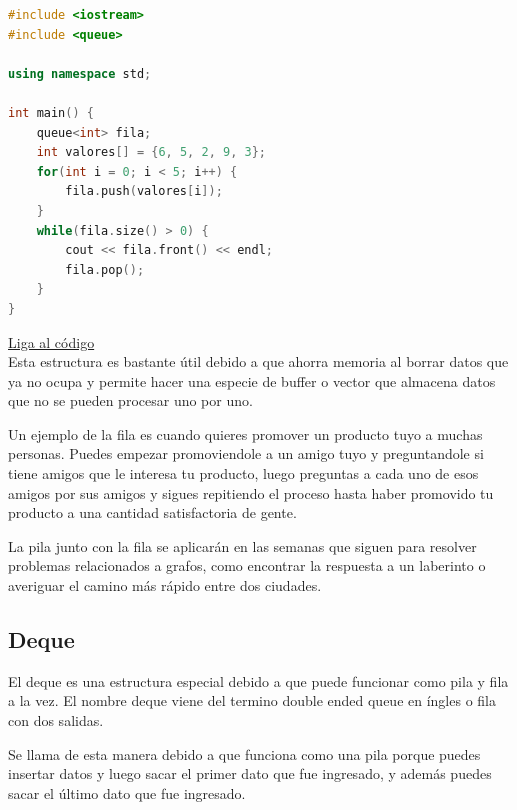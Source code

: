 \documentclass{article}
\begin{document}
\begin{lstlisting}[language=C++, title=Filas]
#include <iostream>
#include <queue>

using namespace std;

int main() {
	queue<int> fila;
	int valores[] = {6, 5, 2, 9, 3};
	for(int i = 0; i < 5; i++) {
		fila.push(valores[i]);
	}
	while(fila.size() > 0) {
		cout << fila.front() << endl;
		fila.pop();
	}
}
\end{lstlisting}
\href{https://repl.it/@Jamesscn/Haciendo-filas}{Liga al código} \\

Esta estructura es bastante útil debido a que ahorra memoria al borrar datos que ya no ocupa y permite hacer una especie de buffer o vector que almacena datos que no se pueden procesar uno por uno.

Un ejemplo de la fila es cuando quieres promover un producto tuyo a muchas personas. Puedes empezar promoviendole a un amigo tuyo y preguntandole si tiene amigos que le interesa tu producto, luego preguntas a cada uno de esos amigos por sus amigos y sigues repitiendo el proceso hasta haber promovido tu producto a una cantidad satisfactoria de gente.

La pila junto con la fila se aplicarán en las semanas que siguen para resolver problemas relacionados a grafos, como encontrar la respuesta a un laberinto o averiguar el camino más rápido entre dos ciudades.

\subsection{Deque}

El deque es una estructura especial debido a que puede funcionar como pila y fila a la vez. El nombre deque viene del termino double ended queue en íngles o fila con dos salidas.

Se llama de esta manera debido a que funciona como una pila porque puedes insertar datos y luego sacar el primer dato que fue ingresado, y además puedes sacar el último dato que fue ingresado.
\end{document}
